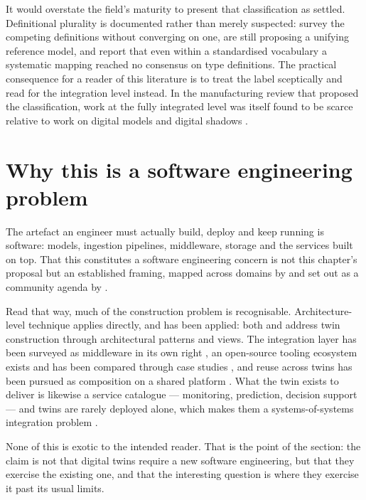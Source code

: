It would overstate the field's maturity to present that classification as
settled. Definitional plurality is documented rather than merely suspected:
\citet{semeraro_digital_2021} survey the competing definitions without
converging on one, \citet{pfeiffer_towards_2025} are still proposing a
unifying reference model, and \citet{ellwein_rethinking_2025} report that even
within a standardised vocabulary a systematic mapping reached no consensus on
type definitions. The practical consequence for a reader of this literature is
to treat the label sceptically and read for the integration level instead. In
the manufacturing review that proposed the classification, work at the fully
integrated level was itself found to be scarce relative to work on digital
models and digital shadows \citep{kritzinger_digital_2018}.

\section{Why this is a software engineering problem}
\label{sec:dt-intro:se-problem}

The artefact an engineer must actually build, deploy and keep running is
software: models, ingestion pipelines, middleware, storage and the services
built on top. That this constitutes a software engineering concern is not this
chapter's proposal but an established framing, mapped across domains by
\citet{dalibor_cross-domain_2022} and set out as a community agenda by
\citet{cleophas_community-sourced_2022}.

Read that way, much of the construction problem is recognisable.
Architecture-level technique applies directly, and has been applied: both
\citet{tekinerdogan_systems_2020} and \citet{ferko_architecting_2022}
address twin construction through architectural patterns and views. The
integration layer has been surveyed as middleware in its own right
\citep{almeida_middleware_2023}, an open-source tooling ecosystem exists and
has been compared through case studies \citep{gil_survey_2024}, and reuse
across twins has been pursued as composition on a shared platform
\citep{talasila_composable_2025}. What the twin exists to deliver is likewise
a service catalogue --- monitoring, prediction, decision support
\citep{frasheri_advanced_2024} --- and twins are rarely deployed alone, which
makes them a systems-of-systems integration problem
\citep{michael_integration_2022, combemale_challenges_2025}.

None of this is exotic to the intended reader. That is the point of the
section: the claim is not that digital twins require a new software
engineering, but that they exercise the existing one, and that the interesting
question is where they exercise it past its usual limits.

